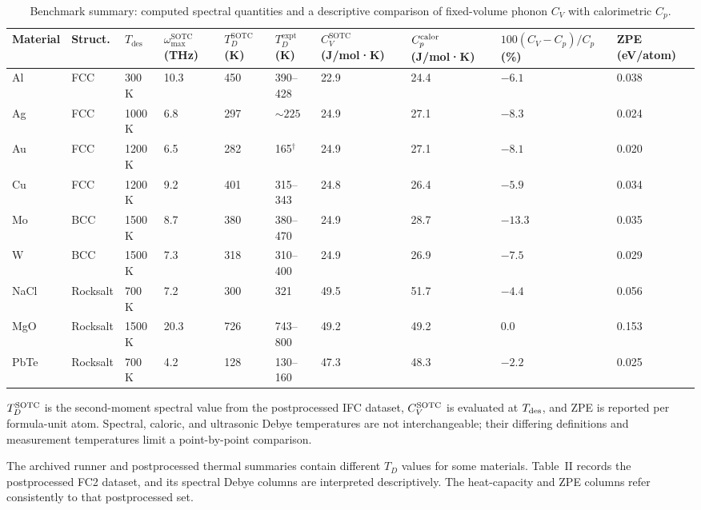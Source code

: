 \documentclass[aps,prb,reprint,amsmath,amssymb,floatfix]{revtex4-2}
\begin{document}
\color{revisionblue}
\begin{table}[htbp]
\tiny
\caption{Benchmark summary: computed spectral quantities and a descriptive comparison of fixed-volume phonon $C_V$ with calorimetric $C_p$.}
\begin{ruledtabular}
\begin{tabular}{llllllllll}Material & Struct. & \(T_\text{des}\) & \(\omega_\text{max}^\text{SOTC}\) (THz) & \(T_D^\text{SOTC}\) (K) & \(T_D^\text{expt}\) (K) & \(C_V^\text{SOTC}\) (J/mol·K) & \(C_p^{\rm calor}\) (J/mol·K) & \(100(C_V-C_p)/C_p\) (\%) & ZPE (eV/atom) \\
\hline
Al & FCC & 300 K & 10.3 & 450 & 390--428 \cite{ref22} & 22.9 &
24.4 & $-6.1$ & 0.038 \\
Ag & FCC & 1000 K & 6.8 & 297 & \(\sim\!225\) \cite{ref25} & 24.9 & 27.1
& $-8.3$ & 0.024 \\
Au & FCC & 1200 K & 6.5 & 282 & 165\(^\dagger\) \cite{ref23} & 24.9 &
27.1 & $-8.1$ & 0.020 \\
Cu & FCC & 1200 K & 9.2 & 401 & 315--343 \cite{ref24,ref33} & 24.8 & 26.4 &
$-5.9$ & 0.034 \\
Mo & BCC & 1500 K & 8.7 & 380 & 380--470 \cite{ref26} & 24.9 &
28.7 & $-13.3$ & 0.035 \\
W & BCC & 1500 K & 7.3 & 318 & 310--400 \cite{ref27} & 24.9 & 26.9 & $-7.5$
& 0.029 \\
NaCl & Rocksalt & 700 K & 7.2 & 300 & 321 \cite{ref28} & 49.5 & 51.7 &
$-4.4$ & 0.056 \\
MgO & Rocksalt & 1500 K & 20.3 & 726 & 743--800 \cite{ref29,ref30} &
49.2 & 49.2 & 0.0 & 0.153 \\
PbTe & Rocksalt & 700 K & 4.2 & 128 & 130--160 \cite{ref31,ref32} & 47.3
& 48.3 & $-2.2$ & 0.025 \\
\end{tabular}
\end{ruledtabular}
\label{tab:2}
\end{table}
\color{black}

\color{revisionblue}
\(T_D^{\rm SOTC}\) is the second-moment spectral value from the
postprocessed IFC dataset, \(C_V^{\rm SOTC}\) is evaluated at
\(T_{\rm des}\), and ZPE is reported per formula-unit atom. Spectral, caloric,
and ultrasonic Debye temperatures are not interchangeable; their differing
definitions and measurement temperatures limit a point-by-point comparison.
\color{black}

\color{revisionblue}
The archived runner and postprocessed thermal summaries contain different
\(T_D\) values for some materials. Table~II records the postprocessed FC2
dataset, and its spectral Debye columns are interpreted descriptively. The
heat-capacity and ZPE columns refer consistently to that postprocessed set.
\color{black}
\end{document}
